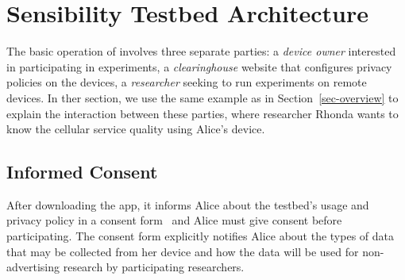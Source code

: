 \section{Sensibility Testbed Architecture}\label{sec-design}

The basic operation of \sysname involves three separate 
parties: a \textit{device owner} interested in participating in 
experiments, a \textit{clearinghouse} website that configures privacy policies on the 
devices,  a \textit{researcher} seeking to run experiments on 
remote devices. 
In ther section, we use the same example as in 
Section~\ref{sec-overview} to explain the interaction between these 
parties, where researcher Rhonda wants to know the cellular service quality 
using Alice's device.


\subsection{Informed Consent}\label{subsec:informed-consent}

After downloading the app, it informs Alice about the testbed's usage and 
privacy policy in a consent form~\cite{consent} and Alice must give consent 
before participating. The consent form explicitly notifies Alice about the 
types of data that may be collected from her device and how the data will
be used for non-advertising research by participating researchers.

